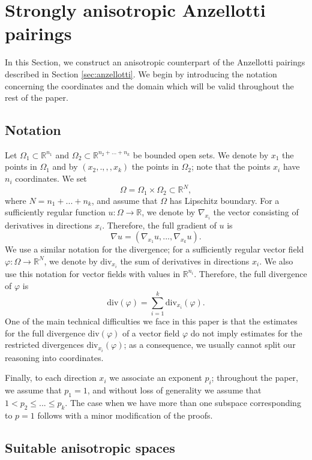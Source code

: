 \documentclass[reqno,12pt]{amsart}
\def\R{\mathbb R}
\numberwithin{equation}{section}
\begin{document}
\section{Strongly anisotropic Anzellotti pairings}\label{sec:anisotropicspaces}

In this Section, we construct an anisotropic counterpart of the Anzellotti pairings described in Section \ref{sec:anzellotti}. We begin by introducing the notation concerning the coordinates and the domain which will be valid throughout the rest of the paper.

\subsection{Notation}

Let $\Omega_1 \subset \R^{n_1}$ and $\Omega_2 \subset \R^{n_2+...+n_k}$ be bounded open sets. We denote by $x_1$ the points in $\Omega_1$ and by $(x_2,.,,,x_k)$ the points in $\Omega_2$; note that the points $x_i$ have $n_i$ coordinates. We set
$$\Omega = \Omega_1 \times \Omega_2 \subset \R^{N},$$
where $N = n_1 + ... + n_k$, and assume that $\Omega$ has Lipschitz boundary. For a sufficiently regular function $u: \Omega \rightarrow \R$, we denote by $\nabla_{x_i}$ the vector consisting of derivatives in directions $x_i$. Therefore, the full gradient of $u$ is 
$$\nabla u = (\nabla_{x_1} u, ..., \nabla_{x_k} u).$$
We use a similar notation for the divergence; for a sufficiently regular vector field $\varphi: \Omega \rightarrow \R^N$, we denote by $\mathrm{div}_{x_i}$ the sum of derivatives in directions $x_i$. We also use this notation for vector fields with values in $\R^{n_i}$. Therefore, the full divergence of $\varphi$ is
$$ \mathrm{div}(\varphi) = \sum_{i = 1}^k \mathrm{div}_{x_i}(\varphi). $$
One of the main technical difficulties we face in this paper is that the estimates for the full divergence $\mathrm{div}(\varphi)$ of a vector field $\varphi$ do not imply estimates for the restricted divergences $\mathrm{div}_{x_i}(\varphi)$; as a consequence, we usually cannot split our reasoning into coordinates.

Finally, to each direction $x_i$ we associate an exponent $p_i$; throughout the paper, we assume that $p_1 = 1$, and without loss of generality we assume that $1 < p_2 \leq ... \leq p_k$. The case when we have more than one subspace corresponding to $p = 1$ follows with a minor modification of the proofs.


\subsection{Suitable anisotropic spaces}
\end{document}
